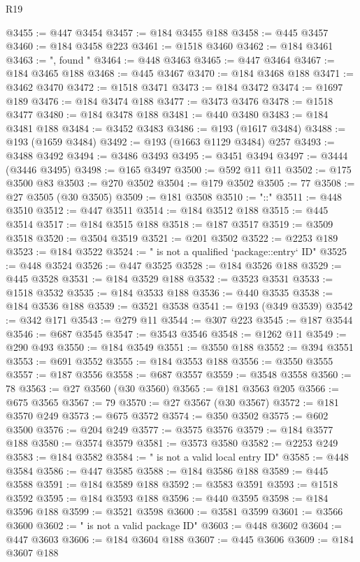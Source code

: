 \begin{lexlean}{R19}
\begin{coremodule}
@3455 := @447 @3454
@3457 := @184 @3455 @188
@3458 := @445 @3457
@3460 := @184 @3458 @223
@3461 := @1518 @3460
@3462 := @184 @3461
@3463 := ", found "
@3464 := @448 @3463
@3465 := @447 @3464
@3467 := @184 @3465 @188
@3468 := @445 @3467
@3470 := @184 @3468 @188
@3471 := @3462 @3470
@3472 := @1518 @3471
@3473 := @184 @3472
@3474 := @1697 @189
@3476 := @184 @3474 @188
@3477 := @3473 @3476
@3478 := @1518 @3477
@3480 := @184 @3478 @188
@3481 := @440 @3480
@3483 := @184 @3481 @188
@3484 := @3452 @3483
@3486 := @193 (@1617 @3484)
@3488 := @193 (@1659 @3484)
@3492 := @193 (@1663 @1129 @3484) @257
@3493 := @3488 @3492
@3494 := @3486 @3493
@3495 := @3451 @3494
@3497 := @3444 (@3446 @3495)
@3498 := @165 @3497
@3500 := @592 @11 @11
@3502 := @175 @3500 @83
@3503 := @270 @3502
@3504 := @179 @3502
@3505 := 77
@3508 := @27 @3505 (@30 @3505)
@3509 := @181 @3508
@3510 := "::"
@3511 := @448 @3510
@3512 := @447 @3511
@3514 := @184 @3512 @188
@3515 := @445 @3514
@3517 := @184 @3515 @188
@3518 := @187 @3517
@3519 := @3509 @3518
@3520 := @3504 @3519
@3521 := @201 @3502
@3522 := @2253 @189
@3523 := @184 @3522
@3524 := " is not a qualified `package::entry` ID"
@3525 := @448 @3524
@3526 := @447 @3525
@3528 := @184 @3526 @188
@3529 := @445 @3528
@3531 := @184 @3529 @188
@3532 := @3523 @3531
@3533 := @1518 @3532
@3535 := @184 @3533 @188
@3536 := @440 @3535
@3538 := @184 @3536 @188
@3539 := @3521 @3538
@3541 := @193 (@349 @3539)
@3542 := @342 @171
@3543 := @279 @11
@3544 := @307 @223
@3545 := @187 @3544
@3546 := @687 @3545
@3547 := @3543 @3546
@3548 := @1262 @11
@3549 := @290 @493
@3550 := @184 @3549
@3551 := @3550 @188
@3552 := @394 @3551
@3553 := @691 @3552
@3555 := @184 @3553 @188
@3556 := @3550 @3555
@3557 := @187 @3556
@3558 := @687 @3557
@3559 := @3548 @3558
@3560 := 78
@3563 := @27 @3560 (@30 @3560)
@3565 := @181 @3563 @205
@3566 := @675 @3565
@3567 := 79
@3570 := @27 @3567 (@30 @3567)
@3572 := @181 @3570 @249
@3573 := @675 @3572
@3574 := @350 @3502
@3575 := @602 @3500
@3576 := @204 @249
@3577 := @3575 @3576
@3579 := @184 @3577 @188
@3580 := @3574 @3579
@3581 := @3573 @3580
@3582 := @2253 @249
@3583 := @184 @3582
@3584 := " is not a valid local entry ID"
@3585 := @448 @3584
@3586 := @447 @3585
@3588 := @184 @3586 @188
@3589 := @445 @3588
@3591 := @184 @3589 @188
@3592 := @3583 @3591
@3593 := @1518 @3592
@3595 := @184 @3593 @188
@3596 := @440 @3595
@3598 := @184 @3596 @188
@3599 := @3521 @3598
@3600 := @3581 @3599
@3601 := @3566 @3600
@3602 := " is not a valid package ID"
@3603 := @448 @3602
@3604 := @447 @3603
@3606 := @184 @3604 @188
@3607 := @445 @3606
@3609 := @184 @3607 @188

\end{coremodule}
\end{lexlean}
